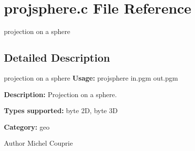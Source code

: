 \section{projsphere.c File Reference}
\label{projsphere_8c}


projection on a sphere  




\subsection{Detailed Description}
projection on a sphere {\bfseries Usage:} projsphere in.pgm out.pgm

{\bfseries Description:} Projection on a sphere.

{\bfseries Types supported:} byte 2D, byte 3D

{\bfseries Category:} geo

\begin{DoxyAuthor}{Author}
Michel Couprie 
\end{DoxyAuthor}
